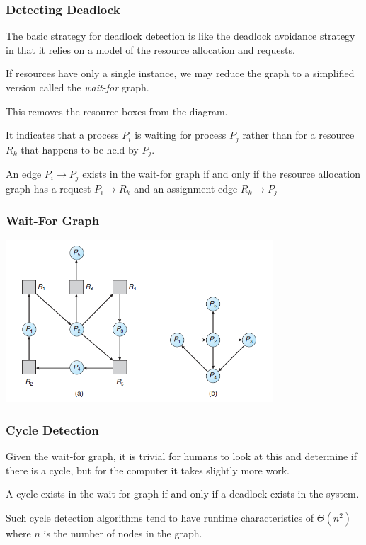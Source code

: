 \begin{frame}
	\frametitle{Detecting Deadlock}

	The basic strategy for deadlock detection is like the deadlock avoidance strategy in that it relies on a model of the resource allocation and requests.

	If resources have only a single instance, we may reduce the graph to a simplified version called the \textit{wait-for} graph.

	This removes the resource boxes from the diagram.

	It indicates that a process $P_{i}$ is waiting for process $P_{j}$ rather than for a resource $R_{k}$ that happens to be held by $P_{j}$.

	An edge $P_{i} \rightarrow P_{j}$ exists in the wait-for graph if and only if the resource allocation graph has a request $P_{i} \rightarrow R_{k}$ and an assignment edge $R_{k} \rightarrow P_{j}$

\end{frame}

\begin{frame}
	\frametitle{Wait-For Graph}

	\begin{center}
		\includegraphics[width=0.75\textwidth]{images/rag-waitfor.png}
	\end{center}

\end{frame}

\begin{frame}
	\frametitle{Cycle Detection}

	Given the wait-for graph, it is trivial for humans to look at this and determine if there is a cycle, but for the computer it takes slightly more work.

	A cycle exists in the wait for graph if and only if a deadlock exists in the system.

	Such cycle detection algorithms tend to have runtime characteristics of $\Theta(n^{2})$ where $n$ is the number of nodes in the graph.

\end{frame}

